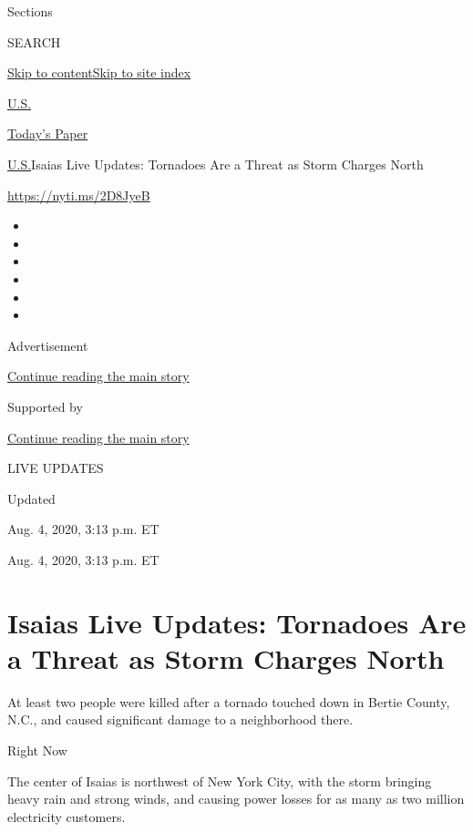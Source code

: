Sections

SEARCH

\protect\hyperlink{site-content}{Skip to
content}\protect\hyperlink{site-index}{Skip to site index}

\href{https://www.nytimes.com/section/us}{U.S.}

\href{https://myaccount.nytimes.com/auth/login?response_type=cookie\&client_id=vi}{}

\href{https://www.nytimes.com/section/todayspaper}{Today's Paper}

\href{/section/us}{U.S.}\textbar{}Isaias Live Updates: Tornadoes Are a
Threat as Storm Charges North

\url{https://nyti.ms/2D8JyeB}

\begin{itemize}
\item
\item
\item
\item
\item
\item
\end{itemize}

Advertisement

\protect\hyperlink{after-top}{Continue reading the main story}

Supported by

\protect\hyperlink{after-sponsor}{Continue reading the main story}

LIVE UPDATES

Updated~

Aug. 4, 2020, 3:13 p.m. ET

Aug. 4, 2020, 3:13 p.m. ET

\hypertarget{isaias-live-updates-tornadoes-are-a-threat-as-storm-charges-north}{%
\section{Isaias Live Updates: Tornadoes Are a Threat as Storm Charges
North}\label{isaias-live-updates-tornadoes-are-a-threat-as-storm-charges-north}}

At least two people were killed after a tornado touched down in Bertie
County, N.C., and caused significant damage to a neighborhood there.

Right Now

The center of Isaias is northwest of New York City, with the storm
bringing heavy rain and strong winds, and causing power losses for as
many as two million electricity customers.

